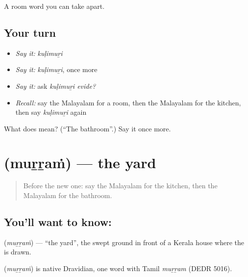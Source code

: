 \begin{grammarlens}[title={What you've built}]
A room word you can take apart.
\end{grammarlens}

\subsection*{Your turn}
\begin{itemize}
\raggedright
  \item \emph{Say it:} \emph{kuḷimuṟi}
  \item \emph{Say it:} \emph{kuḷimuṟi}, once more
  \item \emph{Say it:} ask \emph{kuḷimuṟi evide?}
  \item \emph{Recall:} say the Malayalam for a room, then the Malayalam for the kitchen, then say \emph{kuḷimuṟi} again
\end{itemize}

\begin{tcolorbox}[breakable,colback=teal!4,colframe=teal!35!black,title={Before you move on}]
What does  mean? (\textquotedblleft{}The bathroom\textquotedblright{}.) Say it once more.
\end{tcolorbox}
\section[\texorpdfstring{\ml{മുറ്റം} (muṟṟaṁ)}{മുറ്റം (muṟṟaṁ)}]{ (muṟṟaṁ) — the yard}

\label{lesson:ML-C128-yard}



\begin{quote}
Before the new one: say the Malayalam for the kitchen, then the Malayalam for the bathroom.
\end{quote}

\subsection*{You'll want to know: }
\textbf{} (\emph{muṟṟaṁ}) — \textquotedblleft{}the yard\textquotedblright{}, the swept ground in front of a Kerala house where the \textbf{} is drawn.

\begin{cousinweb}
\textbf{} (\emph{muṟṟaṁ}) is native Dravidian, one word with Tamil \emph{muṟṟam} (DEDR 5016).
\end{cousinweb}

